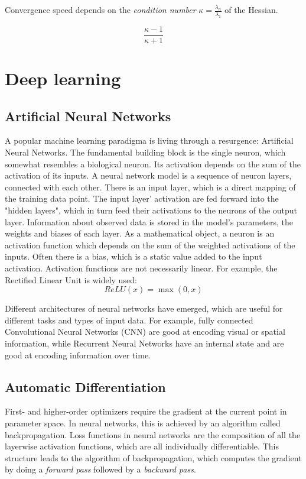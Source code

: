 \documentclass[twoside,12pt,a4paper]{report}
\begin{document}
Convergence speed depends on the \textit{condition number} $\kappa = \frac{\lambda_n}{\lambda_1}$ of the Hessian.

$$ \frac{\kappa - 1}{\kappa + 1}$$


\section{Deep learning}
\subsection{Artificial Neural Networks}
A popular machine learning paradigma is living through a resurgence: Artificial Neural Networks. The fundamental building block is the single neuron, which somewhat resembles a biological neuron. Its activation depends on the sum of the activation of its inputs. A neural network model is a sequence of neuron layers, connected with each other. There is an input layer, which is a direct mapping of the training data point. The input layer' activation are fed forward into the "hidden layers", which in turn feed their activations to the neurons of the output layer. Information about observed data is stored in the model's parameters, the weights and biases of each layer.
As a mathematical object, a neuron is an activation function which depends on the sum of the weighted activations of the inputs. Often there is a bias, which is a static value added to the input activation. Activation functions are not necessarily linear.
For example, the Rectified Linear Unit is widely used:
$$ReLU(x) = \max(0,x) $$

Different architectures of neural networks have emerged, which are useful for different tasks and types of input data. For example, fully connected Convolutional Neural Networks (CNN) are good at encoding visual or spatial information, while Recurrent Neural Networks have an internal state and are good at encoding information over time.


\subsection{Automatic Differentiation}
First- and higher-order optimizers require the gradient at the current point in parameter space. In neural networks, this is achieved by an algorithm called backpropagation.
Loss functions in neural networks are the composition of all the layerwise activation functions, which are all individually differentiable. This structure leads to the algorithm of backpropagation, which computes the gradient by doing a \textit{forward pass} followed by a \textit{backward pass}.
\end{document}
